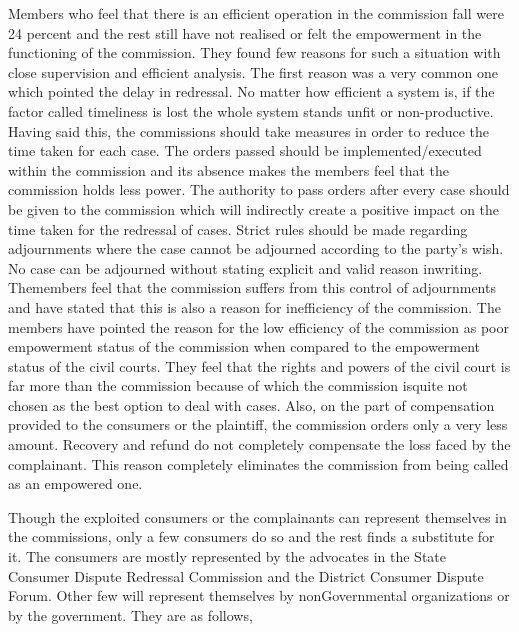 \begin{multicols}{2}
\noi
Members who feel that there is an efficient operation in the commission fall were 24 percent
and the rest still have not realised or felt the empowerment in the functioning of the
commission. They found few reasons for such a situation with close supervision and efficient
analysis. The first reason was a very common one which pointed the delay in redressal. No
matter how efficient a system is, if the factor called timeliness is lost the whole system stands
unfit or non-productive. Having said this, the commissions should take measures in order to
reduce the time taken for each case. The orders passed should be implemented/executed within
the commission and its absence makes the members feel that the commission holds less power.
The authority to pass orders after every case should be given to the commission which will
indirectly create a positive impact on the time taken for the redressal of cases. Strict rules should
be made regarding adjournments where the case cannot be adjourned according to the party’s
wish. No case can be adjourned without stating explicit and valid reason inwriting. Themembers
feel that the commission suffers from this control of adjournments and have stated that this is
also a reason for inefficiency of the commission. The members have pointed the reason for the
low efficiency of the commission as poor empowerment status of the commission when
compared to the empowerment status of the civil courts. They feel that the rights and powers
of the civil court is far more than the commission because of which the commission isquite not
chosen as the best option to deal with cases. Also, on the part of compensation provided to the
consumers or the plaintiff, the commission orders only a very less amount. Recovery and refund
do not completely compensate the loss faced by the complainant. This reason completely
eliminates the commission from being called as an empowered one.


\noi
Though the exploited consumers or the complainants can represent themselves in the
commissions, only a few consumers do so and the rest finds a substitute for it. The consumers
are mostly represented by the advocates in the State Consumer Dispute Redressal Commission
and the District Consumer Dispute Forum. Other few will represent themselves by nonGovernmental organizations or by the government. They are as follows,


\end{multicols}
